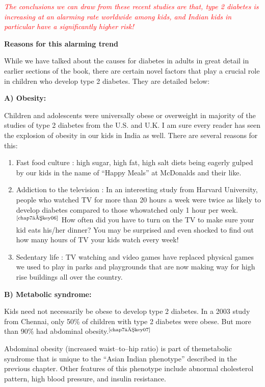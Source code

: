 \textcolor{red}{\textit{The conclusions we can draw from these recent studies are that, type 2 diabetes is increasing at an alarming rate worldwide among kids, and Indian kids in particular have a significantly higher risk!}}

\noindent\textbf{Reasons for this alarming trend}


While we have talked about the causes for diabetes in adults in great detail in earlier sections of the book, there are certain novel factors that play a crucial role in children who develop type 2 diabetes. They are detailed below:

\noindent\textbf{A) Obesity:}

Children and adolescents were universally obese or overweight in majority of the studies of type 2 diabetes from the U.S. and U.K. I am sure every reader has seen the explosion of obesity in our kids in India as well. There are several reasons for this:

\begin{enumerate}[•]
\itemsep=0pt
\item Fast food culture : high sugar, high fat, high salt diets being eagerly gulped by our kids in the name of “Happy Meals” at McDonalds and their like.
\item Addiction to the television : In an interesting study from Harvard University, people who watched TV for more than 20 hours a week were twice as likely to develop diabetes compared to those who\break watched only 1 hour per week.$^{\text{\cite{chap7–key06}}}$ How often did you have to turn on the TV to make sure your kid eats his/her dinner? You may be surprised and even shocked to find out how many hours of TV your kids watch every week!
\item Sedentary life : TV watching and video games have replaced physical games we used to play in parks and playgrounds that are now making way for high rise buildings all over the country.
 \end{enumerate}

\noindent\textbf{B) Metabolic syndrome:}

Kids need not necessarily be obese to develop type 2 diabetes. In a 2003 study from Chennai, only 50\% of children with type 2 diabetes were obese. But more than 90\% had abdominal obesity.$^{\text{\cite{chap7–key07}}}$

Abdominal obesity (increased waist–to–hip ratio) is part of the\break metabolic syndrome that is unique to the “Asian Indian phenotype” described in the previous chapter. Other features of this phenotype include abnormal cholesterol pattern, high blood pressure, and insulin resistance.


